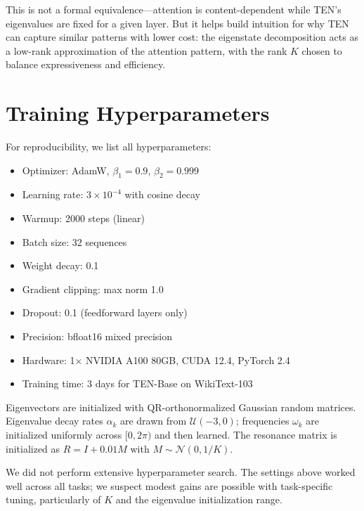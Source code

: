 \documentclass{article}
\begin{document}
This is not a formal equivalence---attention is content-dependent while TEN's eigenvalues are fixed for a given layer. But it helps build intuition for why TEN can capture similar patterns with lower cost: the eigenstate decomposition acts as a low-rank approximation of the attention pattern, with the rank $K$ chosen to balance expressiveness and efficiency.


\section{Training Hyperparameters}
\label{app:hyperparams}

For reproducibility, we list all hyperparameters:

\begin{itemize}[nosep]
\item Optimizer: AdamW, $\beta_1 = 0.9$, $\beta_2 = 0.999$
\item Learning rate: $3 \times 10^{-4}$ with cosine decay
\item Warmup: 2000 steps (linear)
\item Batch size: 32 sequences
\item Weight decay: 0.1
\item Gradient clipping: max norm 1.0
\item Dropout: 0.1 (feedforward layers only)
\item Precision: bfloat16 mixed precision
\item Hardware: 1$\times$ NVIDIA A100 80GB, CUDA 12.4, PyTorch 2.4
\item Training time: 3 days for TEN-Base on WikiText-103
\end{itemize}

Eigenvectors are initialized with QR-orthonormalized Gaussian random matrices. Eigenvalue decay rates $\alpha_k$ are drawn from $\mathcal{U}(-3, 0)$; frequencies $\omega_k$ are initialized uniformly across $[0, 2\pi)$ and then learned. The resonance matrix is initialized as $R = I + 0.01 M$ with $M \sim \mathcal{N}(0, 1/K)$.

We did not perform extensive hyperparameter search. The settings above worked well across all tasks; we suspect modest gains are possible with task-specific tuning, particularly of $K$ and the eigenvalue initialization range.
\end{document}
